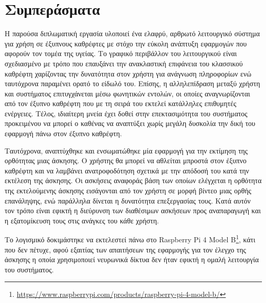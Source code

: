\section{Συμπεράσματα}
\label{sec:conclusions}

Η παρούσα διπλωματική εργασία υλοποιεί ένα ελαφρύ, αρθρωτό λειτουργικό σύστημα για χρήση σε έξυπνους καθρέφτες με στόχο την εύκολη ανάπτυξη εφαρμογών που αφορούν τον τομέα της υγείας. Το γραφικό περιβάλλον του λειτουργικού είναι σχεδιασμένο με τρόπο που επαυξάνει την ανακλαστική επιφάνεια του κλασσικού καθρέφτη χαρίζοντας την δυνατότητα στον χρήστη για ανάγνωση πληροφορίων ενώ ταυτόχρονα παραμένει ορατό το είδωλό του. Επίσης, η αλληλεπίδραση μεταξύ χρήστη και συστήματος επιτυγχάνεται μέσω φωνητικών εντολών, οι οποίες αναγνωρίζονται από τον έξυπνο καθρέφτη που με τη σειρά του εκτελεί κατάλληλες επιθυμητές ενέργειες. Τέλος, ιδιαίτερη μνεία έχει δοθεί στην επεκτασιμότητα του συστήματος προκειμένου να μπορεί ο καθένας να αναπτύξει χωρίς μεγάλη δυσκολία την δική του εφαρμογή πάνω στον έξυπνο καθρέφτη.

Ταυτόχρονα, αναπτύχθηκε και ενσωματώθηκε μία εφαρμογή για την εκτίμηση της ορθότητας μιας άσκησης. Ο χρήστης θα μπορεί να αθλείται μπροστά στον έξυπνο καθρέφτη και να λαμβάνει ανατροφοδότηση σχετικά με την απόδοσή του κατά την εκτέλεση της άσκησης. Οι ασκήσεις αναφοράς βάση των οποίων ελέγχεται η ορθότητα της εκτελούμενης άσκησης εισάγονται από τον χρήστη σε μορφή βίντεο μιας ορθής επανάληψης, ενώ παράλληλα δίνεται η δυνατότητα επεξεργασίας τους. Κατά αυτόν τον τρόπο είναι εφικτή η διεύρυνση των διαθέσιμων ασκήσεων προς αναπαραγωγή και η εξατομίκευση τους στις ανάγκες του κάθε χρήστη.

Το λογισμικό δοκιμάστηκε να εκτελεστεί πάνω στο Raspberry Pi 4 Model B\footnote{\href{https://www.raspberrypi.com/products/raspberry-pi-4-model-b/}{https://www.raspberrypi.com/products/raspberry-pi-4-model-b/}}, κάτι που δεν πέτυχε, αφού εξαιτίας των απαιτήσεων της εφαρμογής για τον έλεγχο της άσκησης η οποία χρησιμοποιεί νευρωνικά δίκτυα δεν ήταν εφικτή η ομαλή λειτουργία του συστήματος.
